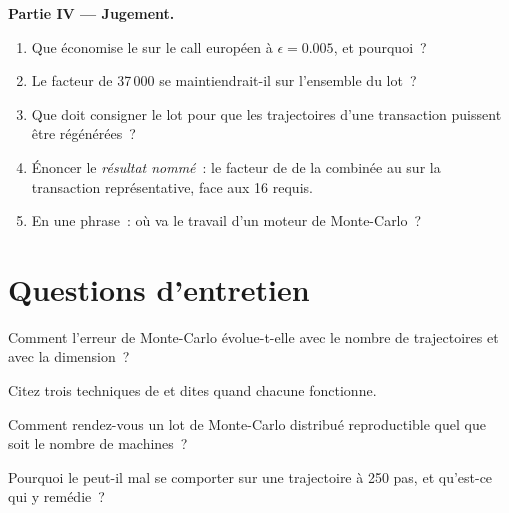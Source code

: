 \begin{problem}
\medskip\noindent\textbf{Partie IV --- Jugement.}
\begin{enumerate}[resume]
\item Que économise le  sur le call européen à $\epsilon = 0.005$, et pourquoi~?
\item Le facteur de 37\,000 se maintiendrait-il sur l'ensemble du lot~?
\item Que doit consigner le lot pour que les trajectoires d'une transaction puissent être régénérées~?
\item Énoncer le \emph{résultat nommé}~: le facteur de  de la  combinée au  sur la transaction représentative, face aux 16 requis.
\item En une phrase~: où va le travail d'un moteur de Monte-Carlo~?
\end{enumerate}
\end{problem}

\section{Questions d'entretien}

\begin{interviewq}\label{iq:qm:monte-carlo:1}
Comment l'erreur de Monte-Carlo évolue-t-elle avec le nombre de trajectoires et avec la dimension~?
\end{interviewq}

\begin{interviewq}\label{iq:qm:monte-carlo:2}
Citez trois techniques de  et dites quand chacune fonctionne.
\end{interviewq}

\begin{interviewq}\label{iq:qm:monte-carlo:3}
Comment rendez-vous un lot de Monte-Carlo distribué reproductible quel que soit le nombre de machines~?
\end{interviewq}

\begin{interviewq}\label{iq:qm:monte-carlo:4}
Pourquoi le  peut-il mal se comporter sur une trajectoire à 250 pas, et qu'est-ce qui y remédie~?
\end{interviewq}

